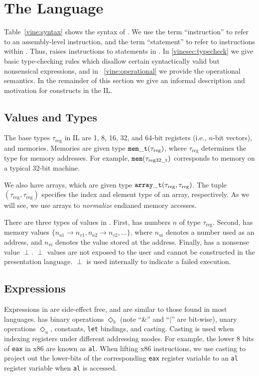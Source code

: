 \section{The \bil Language}
\label{vine:language}




Table~\ref{vine:syntax} shows the syntax of \bil. We use the term
``instruction'' to refer to an assembly-level instruction, and the
term ``statement'' to refer to instructions within \bil.  Thus, \bap
raises instructions to statements in \bil.  In \ref{vinesec:typecheck}
we give basic type-checking rules which disallow certain syntactically
valid but nonsensical expressions, and in ~\ref{vine:operational} we
provide the operational semantics. In the remainder of this section we
give an informal description and motivation for constructs in the IL.


\subsection{Values and Types}
The base types $\tau_{\text{reg}}$ in \bil IL are 1, 8, 16, 32, and
64-bit registers (i.e., $n$-bit vectors), and memories. Memories are
given type ${\tt mem\_t}(\tau_{\text{reg}})$, where $\tau_{\text{reg}}$
determines the type for memory addresses. For example, ${\tt
  mem}(\tau_{\text{reg32\_t}})$ corresponds to memory on a typical
32-bit machine.  

We also have arrays, which are given type ${\tt
  array\_t}(\tau_{\text{reg}},\tau_{\text{reg}})$. The tuple
$(\tau_{\text{reg}},\tau_{\text{reg}})$ specifies the index and
element type of an array, respectively.  As we will see, we use arrays
to \emph{normalize} endianed memory accesses.

There are three types of values in \bil. First, \bil has numbers $n$
of type $\tau_{\text{reg}}$. Second, \bil has memory values $\{
n_{a1} \rightarrow n_{v1}, n_{a2} \rightarrow n_{v2}, ... \}$, where
$n_{ai}$ denotes a number used as an address, and $n_{vi}$ denotes the
value stored at the address.  Finally, \bil has a nonsense value
$\perp$. $\perp$ values are not exposed to the user and cannot be
constructed in the presentation language.  $\perp$ is used internally
to indicate a failed execution.


\subsection{Expressions}
Expressions in \bil are side-effect free, and are similar to those
found in most languages.  \bil has binary operations $\Diamond_b$
(note ``\&'' and ``$|$'' are bit-wise), unary operations $\Diamond_u$,
constants, {\tt let} bindings, and casting.  Casting is used when
indexing registers under different addressing modes. For example, the
lower 8 bits of {\tt eax} in x86 are known as {\tt al}.  When lifting
x86 instructions, we use casting to project out the lower-bits of the
corresponding {\tt eax} register variable to an {\tt al} register
variable when {\tt al} is accessed.

